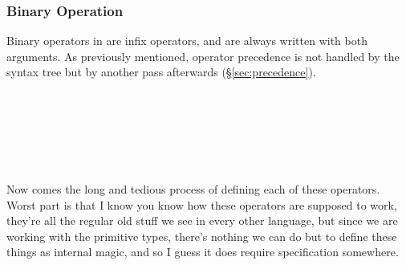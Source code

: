 \subsubsection{Binary Operation}
\label{sec:binop}

Binary operators in \Poetry{} are infix operators, and are always written
with both arguments. As previously mentioned, operator precedence is not
handled by the syntax tree but by another pass afterwards (\S\ref{sec:precedence}).

\begin{bnf*}
     \\
     \\
    \bnfmore{
        \bnfts{\op{==}}
        \bnfor
        \bnfts{\op{===}}
        \bnfor
        \bnfts{\op{<}}
        \bnfor
        \bnfts{\op{>}}
        \bnfor
        \bnfts{\op{>=}}
        \bnfor
        \bnfts{\op{<=}}
        \bnfor
    } \\
    \bnfmore{
        \bnfts{\op{\&}}
        \bnfor
        \bnfts{\op{|}}
        \bnfor
        \bnfts{\op{\textasciicircum}}
        \bnfor
        \bnfts{\op{<\textasciitilde}}
        \bnfor
        \bnfts{\op{\textasciitilde>}}
        \bnfor
        \bnfts{\op{<<\textasciitilde}}
        \bnfor
        \bnfts{\op{\textasciitilde>>}}
        \bnfor
        \bnfts{\op{<\textasciitilde\textasciitilde}}
        \bnfor
        \bnfts{\op{\textasciitilde\textasciitilde>}}
        \bnfor
        \bnfts{\op{,}}
        \bnfor
        \bnfts{\op{:}}
        \bnfor
    } \\
    \bnfmore{
        \bnfts{\op{<>}}
        \bnfor
        \bnfts{\op{>>}}
        \bnfor
        \bnfts{\op{<<}}
        \bnfor
        \bnfts{\op{|>}}
        \bnfor
        \bnfts{\op{<|}}
    } \\
\end{bnf*}

Now comes the long and tedious process of defining each of these operators.
Worst part is that I know you know how these operators are supposed to work,
they're all the regular old stuff we see in every other language, but since
we are working with the primitive types, there's nothing we can do but to
define these things as internal magic, and so I guess it does require
specification somewhere.

